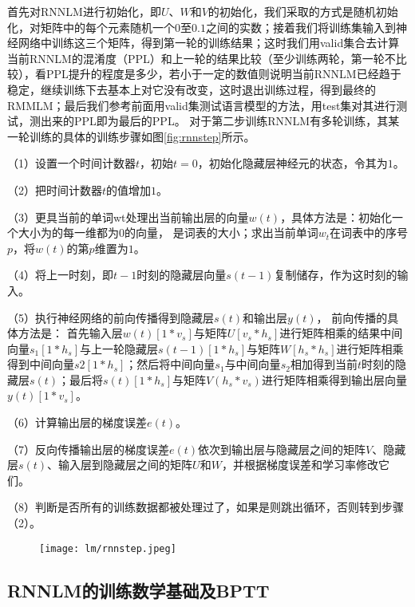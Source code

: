 首先对RNNLM进行初始化，即$U$、$W$和$V$的初始化，我们采取的方式是随机初始化，对矩阵中的每个元素随机一个$0$至$0.1$之间的实数；接着我们将训练集输入到神经网络中训练这三个矩阵，得到第一轮的训练结果；这时我们用valid集合去计算当前RNNLM的混淆度（PPL）和上一轮的结果比较（至少训练两轮，第一轮不比较），看PPL提升的程度是多少，若小于一定的数值则说明当前RNNLM已经趋于稳定，继续训练下去基本上对它没有改变，这时退出训练过程，得到最终的RMMLM；最后我们参考前面用valid集测试语言模型的方法，用test集对其进行测试，测出来的PPL即为最后的PPL。
对于第二步训练RNNLM有多轮训练，其某一轮训练的具体的训练步骤如图\ref{fig:rnnstep}所示。

（1）设置一个时间计数器$t$，初始$t=0$，初始化隐藏层神经元的状态，令其为$1$。

（2）把时间计数器$t$的值增加$1$。

（3）更具当前的单词wt处理出当前输出层的向量$w(t)$，具体方法是：初始化一个大小为的每一维都为$0$的向量， 是词表的大小；求出当前单词$w_t$在词表中的序号$p$，将$w(t)$的第$p$维置为$1$。

（4）将上一时刻，即$t-1$时刻的隐藏层向量$s(t-1)$复制储存，作为这时刻的输入。

（5）执行神经网络的前向传播得到隐藏层$s(t)$和输出层$y(t)$，
前向传播的具体方法是：
首先输入层$w(t)[1*{v_s}]$与矩阵$U[{v_s}*{h_s}]$进行矩阵相乘的结果中间向量${s_1}[1*{h_s}]$与上一轮隐藏层$s(t-1)[1*{h_s}]$与矩阵$W[{h_s}*{h_s}]$进行矩阵相乘得到中间向量$s2[1*{h_s}]$；然后将中间向量$s_1$与中间向量$s_2$相加得到当前$t$时刻的隐藏层$s(t)$；最后将$s(t)[1*{h_s}]$与矩阵$V({h_s}*{v_s})$进行矩阵相乘得到输出层向量$y(t)[1*{v_s}]$。

（6）计算输出层的梯度误差$e(t)$。

（7）反向传播输出层的梯度误差$e(t)$依次到输出层与隐藏层之间的矩阵$V$、隐藏层$s(t)$、输入层到隐藏层之间的矩阵$U$和$W$，并根据梯度误差和学习率修改它们。

（8）判断是否所有的训练数据都被处理过了，如果是则跳出循环，否则转到步骤（2）。


\begin{figure}[!htbp]
  \centering
  \begin{minipage}[b]{0.6\textwidth}
    \captionstyle{\centering}
    \centering
    \texttt{[image: lm/rnnstep.jpeg]}
  \end{minipage}     
\end{figure}


\subsection{RNNLM的训练数学基础及BPTT}
